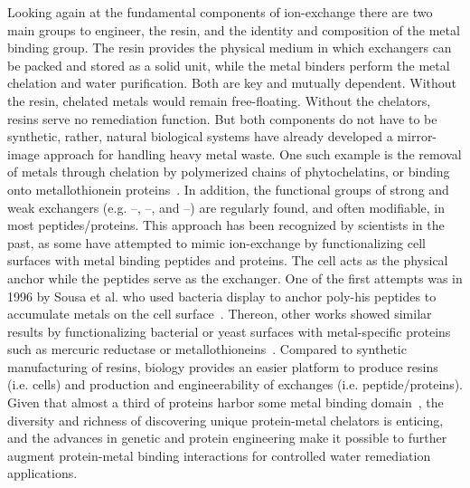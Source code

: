 \documentclass[../main/main]{subfiles}
\begin{document}
Looking again at the fundamental components of ion-exchange there are two main groups to engineer, the resin, and the identity and composition of the metal binding group. The resin provides the physical medium in which exchangers can be packed and stored as a solid unit, while the metal binders perform the metal chelation and water purification. Both are key and mutually dependent. Without the resin, chelated metals would remain free-floating. Without the chelators, resins serve no remediation function. But both components do not have to be synthetic, rather, natural biological systems have already developed a mirror-image approach for handling heavy metal waste. One such example is the removal of metals through chelation by polymerized chains of phytochelatins, or binding onto metallothionein proteins~\cite{clemens2002,cobbett2002phytochelatins}. In addition, the functional groups of strong and weak exchangers (e.g. --, --, and --) are regularly found, and often modifiable, in most peptides/proteins. This approach has been recognized by scientists in the past, as some have attempted to mimic ion-exchange by functionalizing cell surfaces with metal binding peptides and proteins. The cell acts as the physical anchor while the peptides serve as the exchanger. One of the first attempts was in 1996 by Sousa et al. who used bacteria display to anchor poly-his peptides to accumulate metals on the cell surface~\cite{sousa1996}.
Thereon, other works showed similar results by functionalizing bacterial or yeast surfaces with metal-specific proteins such as mercuric reductase or metallothioneins~\cite{bae2003,kuroda2003,pazirandeh1998}. Compared to synthetic manufacturing of resins, biology provides an easier platform to produce resins (i.e. cells) and production and engineerability of exchanges (i.e. peptide/proteins). Given that almost a third of proteins harbor some metal binding domain~\cite{waldron2009bacterial}, the diversity and richness of discovering unique protein-metal chelators is enticing, and the advances in genetic and protein engineering make it possible to further augment protein-metal binding interactions for controlled water remediation applications.
\end{document}
